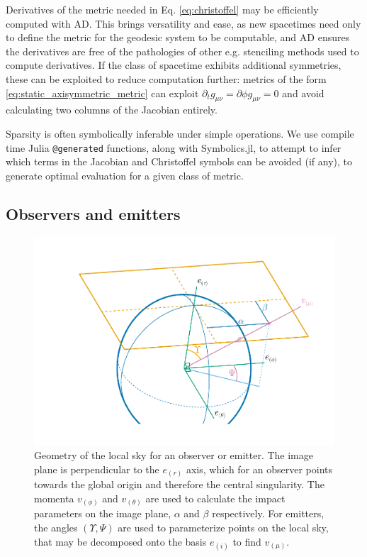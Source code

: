 Derivatives of the metric needed in Eq. \eqref{eq:christoffel} may be efficiently computed with AD. This brings versatility and ease, as new spacetimes need only to define the metric for the geodesic system to be computable, and AD ensures the derivatives are free of the pathologies of other e.g. stenciling methods used to compute derivatives. If the class of spacetime exhibits additional symmetries, these can be exploited to reduce computation further: metrics of the form \eqref{eq:static_axisymmetric_metric} can exploit $\partial_t g_{\mu\nu} = \partial{\phi} g_{\mu\nu} = 0$ and avoid calculating two columns of the Jacobian entirely.

Sparsity is often symbolically inferable under simple operations. We use compile time Julia \texttt{@generated} functions, along with Symbolics.jl, to attempt to infer which terms in the Jacobian and Christoffel symbols can be avoided (if any), to generate optimal evaluation for a given class of metric. 


\subsection{Observers and emitters}

\begin{figure}
    \centering
    \includegraphics[width=0.99\linewidth]{figures/skycoords.pdf}
    \caption{Geometry of the local sky for an observer or emitter. The image plane is perpendicular to the $e_{(r)}$ axis, which for an observer points towards the global origin and therefore the central singularity. The momenta $v_{(\phi)}$ and $v_{(\theta)}$ are used to calculate the impact parameters on the image plane, $\alpha$ and $\beta$ respectively. For emitters, the angles $(\Upsilon, \Psi)$ are used to parameterize points on the local sky, that may be decomposed onto the basis $e_{(i)}$ to find $v_{(\mu)}$.}
    \label{fig:observer-coordinates}
\end{figure}

